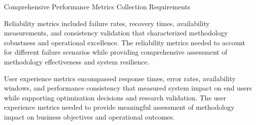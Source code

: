 \begin{table}[H]
\centering
\caption{Comprehensive Performance Metrics Collection Requirements}
\label{tab:performance-metrics-collection}
\end{table}

Reliability metrics included failure rates, recovery times, availability measurements, and consistency validation that characterized methodology robustness and operational excellence. The reliability metrics needed to account for different failure scenarios while providing comprehensive assessment of methodology effectiveness and system resilience.

User experience metrics encompassed response times, error rates, availability windows, and performance consistency that measured system impact on end users while supporting optimization decisions and research validation. The user experience metrics needed to provide meaningful assessment of methodology impact on business objectives and operational outcomes.
